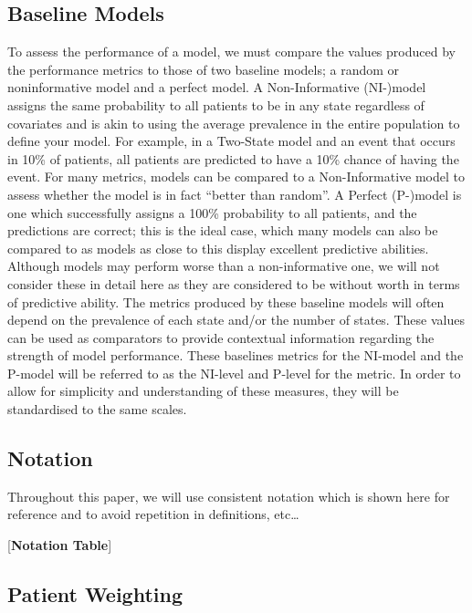 \documentclass[12pt,twoside]{reedthesis}
\begin{document}
\hypertarget{baseline-models}{%
\subsection{Baseline Models}\label{baseline-models}}

To assess the performance of a model, we must compare the values produced by the performance metrics to those of two baseline models; a random or noninformative model and a perfect model.
A Non-Informative (NI-)model assigns the same probability to all patients to be in any state regardless of covariates and is akin to using the average prevalence in the entire population to define your model. For example, in a Two-State model and an event that occurs in 10\% of patients, all patients are predicted to have a 10\% chance of having the event. For many metrics, models can be compared to a Non-Informative model to assess whether the model is in fact ``better than random''.
A Perfect (P-)model is one which successfully assigns a 100\% probability to all patients, and the predictions are correct; this is the ideal case, which many models can also be compared to as models as close to this display excellent predictive abilities. Although models may perform worse than a non-informative one, we will not consider these in detail here as they are considered to be without worth in terms of predictive ability.
The metrics produced by these baseline models will often depend on the prevalence of each state and/or the number of states. These values can be used as comparators to provide contextual information regarding the strength of model performance. These baselines metrics for the NI-model and the P-model will be referred to as the NI-level and P-level for the metric.
In order to allow for simplicity and understanding of these measures, they will be standardised to the same scales.

\hypertarget{notation}{%
\subsection{Notation}\label{notation}}

Throughout this paper, we will use consistent notation which is shown here for reference and to avoid repetition in definitions, etc\ldots{}

{[}\textbf{Notation Table}{]}

\hypertarget{patient-weighting}{%
\subsection{Patient Weighting}\label{patient-weighting}}
\end{document}
